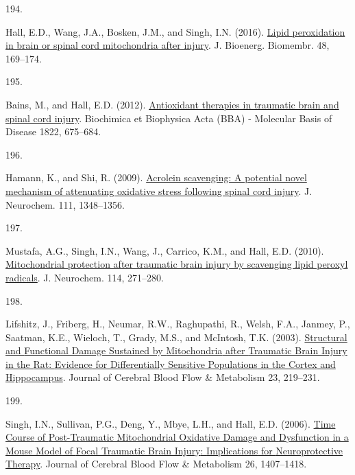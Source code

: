 \documentclass[
]{article}
\newlength{\cslhangindent}
\newlength{\csllabelwidth}
\newlength{\cslentryspacingunit} %
\newenvironment{CSLReferences}[2] %
 {%
  \setlength{\parindent}{0pt}
  \ifodd #1
  \let\oldpar\par
  \def\par{\hangindent=\cslhangindent\oldpar}
  \fi
  \setlength{\parskip}{#2\cslentryspacingunit}
 }%
 {}
\newcommand{\CSLLeftMargin}[1]{\parbox[t]{\csllabelwidth}{#1}}
\newcommand{\CSLRightInline}[1]{\parbox[t]{\linewidth - \csllabelwidth}{#1}\break}
\begin{document}
\begin{CSLReferences}{0}{0}
\leavevmode{}%
\CSLLeftMargin{194. }
\CSLRightInline{Hall, E.D., Wang, J.A., Bosken, J.M., and Singh, I.N. (2016). \href{https://doi.org/10.1007/s10863-015-9600-5}{Lipid peroxidation in brain or spinal cord mitochondria after injury}. J. Bioenerg. Biomembr. 48, 169--174.}

\leavevmode{}%
\CSLLeftMargin{195. }
\CSLRightInline{Bains, M., and Hall, E.D. (2012). \href{https://doi.org/10.1016/j.bbadis.2011.10.017}{Antioxidant therapies in traumatic brain and spinal cord injury}. Biochimica et Biophysica Acta (BBA) - Molecular Basis of Disease 1822, 675--684.}

\leavevmode{}%
\CSLLeftMargin{196. }
\CSLRightInline{Hamann, K., and Shi, R. (2009). \href{https://doi.org/10.1111/j.1471-4159.2009.06395.x}{Acrolein scavenging: A potential novel mechanism of attenuating oxidative stress following spinal cord injury}. J. Neurochem. 111, 1348--1356.}

\leavevmode{}%
\CSLLeftMargin{197. }
\CSLRightInline{Mustafa, A.G., Singh, I.N., Wang, J., Carrico, K.M., and Hall, E.D. (2010). \href{https://doi.org/10.1111/j.1471-4159.2010.06749.x}{Mitochondrial protection after traumatic brain injury by scavenging lipid peroxyl radicals}. J. Neurochem. 114, 271--280.}

\leavevmode{}%
\CSLLeftMargin{198. }
\CSLRightInline{Lifshitz, J., Friberg, H., Neumar, R.W., Raghupathi, R., Welsh, F.A., Janmey, P., Saatman, K.E., Wieloch, T., Grady, M.S., and McIntosh, T.K. (2003). \href{https://doi.org/10.1097/01.WCB.0000040581.43808.03}{Structural and {Functional Damage Sustained} by {Mitochondria} after {Traumatic Brain Injury} in the {Rat}: {Evidence} for {Differentially Sensitive Populations} in the {Cortex} and {Hippocampus}}. Journal of Cerebral Blood Flow \& Metabolism 23, 219--231.}

\leavevmode{}%
\CSLLeftMargin{199. }
\CSLRightInline{Singh, I.N., Sullivan, P.G., Deng, Y., Mbye, L.H., and Hall, E.D. (2006). \href{https://doi.org/10.1038/sj.jcbfm.9600297}{Time {Course} of {Post-Traumatic Mitochondrial Oxidative Damage} and {Dysfunction} in a {Mouse Model} of {Focal Traumatic Brain Injury}: {Implications} for {Neuroprotective Therapy}}. Journal of Cerebral Blood Flow \& Metabolism 26, 1407--1418.}


\end{CSLReferences}
\end{document}
